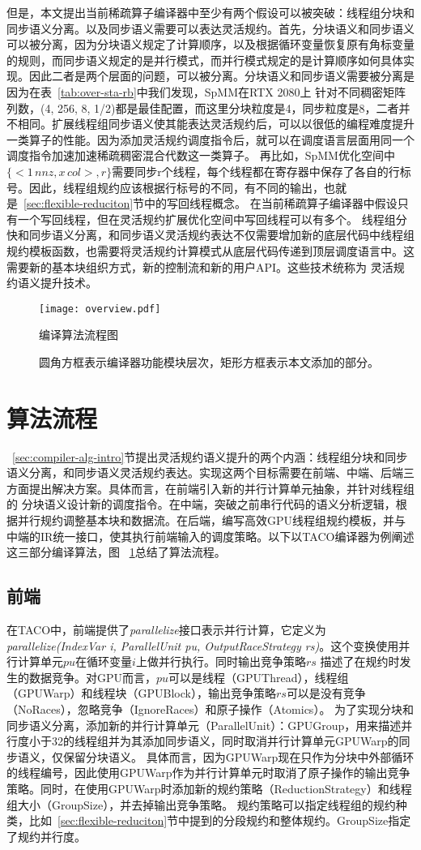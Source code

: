 但是，本文提出当前稀疏算子编译器中至少有两个假设可以被突破：线程组分块和同步语义分离。以及同步语义需要可以表达灵活规约。首先，分块语义和同步语义可以被分离，因为分块语义规定了计算顺序，以及根据循环变量恢复原有角标变量
的规则，而同步语义规定的是并行模式，而并行模式规定的是计算顺序如何具体实现。因此二者是两个层面的问题，可以被分离。分块语义和同步语义需要被分离是因为在表~\ref{tab:over-sta-rb}中我们发现，SpMM在RTX 2080上
针对不同稠密矩阵列数，(4, 256, 8, 1/2)都是最佳配置，而这里分块粒度是4，同步粒度是8，二者并不相同。扩展线程组同步语义使其能表达灵活规约后，可以以很低的编程难度提升一类算子的性能。因为添加灵活规约调度指令后，就可以在调度语言层面用同一个调度指令加速加速稀疏稠密混合代数这一类算子。
再比如，SpMM优化空间中$\{<1\,nnz , x\,col>,r\}$需要同步r个线程，每个线程都在寄存器中保存了各自的行标号。因此，线程组规约应该根据行标号的不同，有不同的输出，也就是~\ref{sec:flexible-reduciton}节中的写回线程概念。
在当前稀疏算子编译器中假设只有一个写回线程，但在灵活规约扩展优化空间中写回线程可以有多个。
线程组分快和同步语义分离，和同步语义灵活规约表达不仅需要增加新的底层代码中线程组规约模板函数，也需要将灵活规约计算模式从底层代码传递到顶层调度语言中。这需要新的基本块组织方式，新的控制流和新的用户API。这些技术统称为
灵活规约语义提升技术。
\begin{figure}[h]%
  \centering
  \texttt{[image: overview.pdf]}
  \caption{编译算法流程图}
  \caption*{圆角方框表示编译器功能模块层次，矩形方框表示本文添加的部分。}
  \label{fig:compiler-overview}
\end{figure}
\section{算法流程}
~\ref{sec:compiler-alg-intro}节提出灵活规约语义提升的两个内涵：线程组分块和同步语义分离，和同步语义灵活规约表达。实现这两个目标需要在前端、中端、后端三方面提出解决方案。具体而言，在前端引入新的并行计算单元抽象，并针对线程组的
分块语义设计新的调度指令。在中端，突破之前串行代码的语义分析逻辑，根据并行规约调整基本块和数据流。在后端，编写高效GPU线程组规约模板，并与中端的IR统一接口，使其执行前端输入的调度策略。以下以TACO编译器为例阐述这三部分编译算法，图
~\ref{fig:compiler-overview}总结了算法流程。
\subsection{前端}
在TACO中，前端提供了\textit{parallelize}接口表示并行计算，它定义为\textit{parallelize(IndexVar i, ParallelUnit pu, OutputRaceStrategy rs)}。这个变换使用并行计算单元$pu$在循环变量$i$上做并行执行。同时输出竞争策略$rs$
描述了在规约时发生的数据竞争。对GPU而言，$pu$可以是线程（GPUThread），线程组（GPUWarp）和线程块（GPUBlock），输出竞争策略$rs$可以是没有竞争（NoRaces），忽略竞争（IgnoreRaces）和原子操作（Atomics）。
为了实现分块和同步语义分离，添加新的并行计算单元（ParallelUnit）：GPUGroup，用来描述并行度小于32的线程组并为其添加同步语义，同时取消并行计算单元GPUWarp的同步语义，仅保留分块语义。
具体而言，因为GPUWarp现在只作为分块中外部循环的线程编号，因此使用GPUWarp作为并行计算单元时取消了原子操作的输出竞争策略。同时，在使用GPUWarp时添加新的规约策略（ReductionStrategy）和线程组大小（GroupSize），并去掉输出竞争策略。
规约策略可以指定线程组的规约种类，比如~\ref{sec:flexible-reduciton}节中提到的分段规约和整体规约。GroupSize指定了规约并行度。
